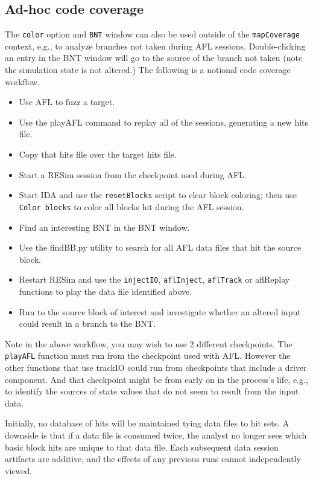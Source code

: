 \documentclass[titlepage]{article}
\begin{document}
\begin{appendices}
\subsection{Ad-hoc code coverage}
The {\tt color} option and {\tt BNT} window can also be used outside of the {\tt mapCoverage} context, e.g., to analyze branches not 
taken during AFL sessions.  Double-clicking an entry in the BNT window will go to the source of the branch not taken (note the simulation state
is not altered.)  The following is a notional code coverage workflow.
\begin{itemize}
\item Use AFL to fuzz a target.
\item Use the playAFL command to replay all of the sessions, generating a new hits file.
\item Copy that hits file over the target hits file.
\item Start a RESim session from the checkpoint used during AFL.
\item Start IDA and use the {\tt resetBlocks} script to clear block coloring; then use {\tt Color blocks} to color all blocks hit
during the AFL session.
\item Find an interesting BNT in the BNT window.
\item Use the findBB.py utility to search for all AFL data files that hit the source block.
\item Restart RESim and use the {\tt injectIO}, {\tt aflInject}, {\tt aflTrack} or {aflReplay} functions to play the data file identified above.
\item Run to the source block of interest and investigate whether an altered input could result in a branch to the BNT.
\end{itemize}
Note in the above workflow, you may wish to use 2 different checkpoints.  The {\tt playAFL} function must run from the
checkpoint used with AFL.  However the other functions that use trackIO could run from checkpoints that include a driver component.  And 
that checkpoint might be from early on in the process's life, e.g., to identify the sources of state values that do not seem to result from
the input data.

Initially, no database of hits will be maintained tying data files to hit sets.  A downside is that if a data file is consumed twice, the analyst no longer sees
which basic block hits are unique to that data file. Each subsequent data session artifacts are additive, and the effects of any previous runs cannot independently viewed.



\end{appendices}
\end{document}
